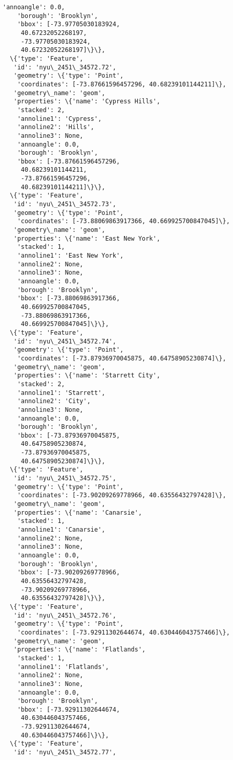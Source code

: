 \documentclass[11pt]{article}
\begin{document}
\begin{tcolorbox}[breakable, size=fbox, boxrule=.5pt, pad at break*=1mm, opacityfill=0]
\begin{Verbatim}[commandchars=\\\{\}]
    'annoangle': 0.0,
    'borough': 'Brooklyn',
    'bbox': [-73.97705030183924,
     40.67232052268197,
     -73.97705030183924,
     40.67232052268197]\}\},
  \{'type': 'Feature',
   'id': 'nyu\_2451\_34572.72',
   'geometry': \{'type': 'Point',
    'coordinates': [-73.87661596457296, 40.68239101144211]\},
   'geometry\_name': 'geom',
   'properties': \{'name': 'Cypress Hills',
    'stacked': 2,
    'annoline1': 'Cypress',
    'annoline2': 'Hills',
    'annoline3': None,
    'annoangle': 0.0,
    'borough': 'Brooklyn',
    'bbox': [-73.87661596457296,
     40.68239101144211,
     -73.87661596457296,
     40.68239101144211]\}\},
  \{'type': 'Feature',
   'id': 'nyu\_2451\_34572.73',
   'geometry': \{'type': 'Point',
    'coordinates': [-73.88069863917366, 40.669925700847045]\},
   'geometry\_name': 'geom',
   'properties': \{'name': 'East New York',
    'stacked': 1,
    'annoline1': 'East New York',
    'annoline2': None,
    'annoline3': None,
    'annoangle': 0.0,
    'borough': 'Brooklyn',
    'bbox': [-73.88069863917366,
     40.669925700847045,
     -73.88069863917366,
     40.669925700847045]\}\},
  \{'type': 'Feature',
   'id': 'nyu\_2451\_34572.74',
   'geometry': \{'type': 'Point',
    'coordinates': [-73.87936970045875, 40.64758905230874]\},
   'geometry\_name': 'geom',
   'properties': \{'name': 'Starrett City',
    'stacked': 2,
    'annoline1': 'Starrett',
    'annoline2': 'City',
    'annoline3': None,
    'annoangle': 0.0,
    'borough': 'Brooklyn',
    'bbox': [-73.87936970045875,
     40.64758905230874,
     -73.87936970045875,
     40.64758905230874]\}\},
  \{'type': 'Feature',
   'id': 'nyu\_2451\_34572.75',
   'geometry': \{'type': 'Point',
    'coordinates': [-73.90209269778966, 40.63556432797428]\},
   'geometry\_name': 'geom',
   'properties': \{'name': 'Canarsie',
    'stacked': 1,
    'annoline1': 'Canarsie',
    'annoline2': None,
    'annoline3': None,
    'annoangle': 0.0,
    'borough': 'Brooklyn',
    'bbox': [-73.90209269778966,
     40.63556432797428,
     -73.90209269778966,
     40.63556432797428]\}\},
  \{'type': 'Feature',
   'id': 'nyu\_2451\_34572.76',
   'geometry': \{'type': 'Point',
    'coordinates': [-73.92911302644674, 40.630446043757466]\},
   'geometry\_name': 'geom',
   'properties': \{'name': 'Flatlands',
    'stacked': 1,
    'annoline1': 'Flatlands',
    'annoline2': None,
    'annoline3': None,
    'annoangle': 0.0,
    'borough': 'Brooklyn',
    'bbox': [-73.92911302644674,
     40.630446043757466,
     -73.92911302644674,
     40.630446043757466]\}\},
  \{'type': 'Feature',
   'id': 'nyu\_2451\_34572.77',

\end{Verbatim}
\end{tcolorbox}
\end{document}
